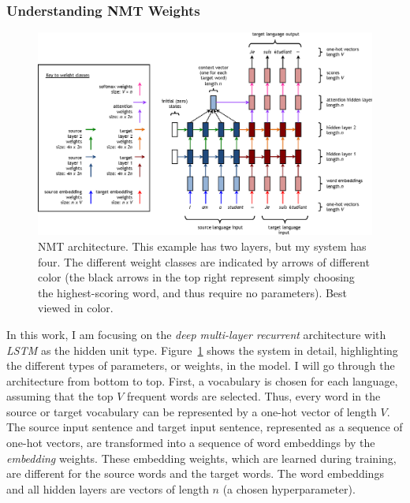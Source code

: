\subsubsection{Understanding NMT Weights}
\label{subsubsec:lstm}
\begin{figure}[t]
\centering
\includegraphics[width=\textwidth]{img/6-2_nmt_complex} %
\caption[Weights of NMT architecture]{NMT architecture. This example has two layers, but my system has four. The different weight classes are indicated by arrows of different color (the black arrows in the top right represent simply choosing the highest-scoring word, and thus require no parameters).
Best viewed in color.
}
\label{fig:nmt_complex}
\end{figure}

In this work, I am focusing on the {\it deep multi-layer recurrent} architecture with {\it
LSTM} as the hidden unit type.
Figure~\ref{fig:nmt_complex} shows the system in detail,
highlighting the different types of parameters, or weights, in the model.
I will go through the architecture from bottom to top.
First, a vocabulary is chosen for each language, assuming that the top $V$ frequent
words are selected.
Thus, every word in the source or target vocabulary can be represented by a one-hot vector of length $V$.
The source input sentence and target input sentence, represented as a sequence
of one-hot vectors, are transformed into a sequence of word embeddings by the
\emph{embedding} weights. 
These embedding weights, which are learned during training, are different for the source words and the target words.
The word embeddings and all hidden layers are vectors of length $n$ (a chosen hyperparameter).

